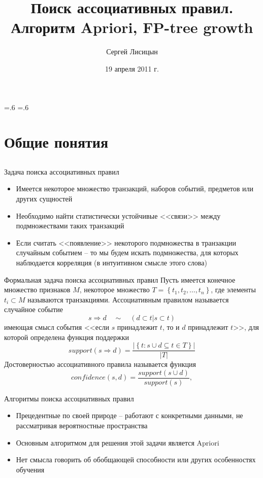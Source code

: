 \documentclass[compress,red]{beamer}
\title[Машинное обучение]{Поиск ассоциативных правил. Алгоритм Apriori, FP-tree growth}
\author{Сергей Лисицын}
\institute{}
\date{19 апреля 2011 г.}
\begin{document}
\section{}
\abovedisplayskip=.6\abovedisplayskip
\belowdisplayskip=.6\belowdisplayskip

\begin{frame}

\titlepage
\end{frame}
\section{Общие понятия}
\subsection{}

\begin{frame}{Задача поиска ассоциативных правил}
\begin{itemize}
	\item Имеется некоторое множество транзакций, наборов событий, предметов или других сущностей
	\item Необходимо найти статистически устойчивые <<связи>> между подмножествами таких транзакций
	\item Если считать <<появление>> некоторого подмножества в транзакции случайным событием -- то мы будем искать подмножества, для которых наблюдается корреляция (в интуитивном смысле этого слова)
\end{itemize}
\end{frame}

\begin{frame}{Формальная задача поиска ассоциативных правил}
Пусть имеется конечное множество признаков $M$, некоторое множество 
$T = \left\{ t_1, t_2, \dots , t_n \right\}$, где элементы $t_i \subset M$ называются транзакциями. 
Ассоциативным правилом называется случайное событие
$$
s \Rightarrow d \quad\sim\quad (d\subset t\vert s \subset t)
$$
имеющая смысл события <<если $s$ принадлежит $t$, то и $d$ принадлежит $t$>>,
для которой определена функция поддержки
$$
support (s\Rightarrow d) = \frac{|\left\{ t: s\cup d \subseteq t \in T\right\}|}{|T|}
$$
Достоверностью ассоциативного правила называется функция
$$
confidence (s,d) = \frac{support(s\cup d)}{support(s)},
$$

\end{frame}

\begin{frame}{Алгоритмы поиска ассоциативных правил}
\begin{itemize}
	\item Прецедентные по своей природе -- работают с конкретными данными, не рассматривая вероятностные пространства
	\item Основным алгоритмом для решения этой задачи является Apriori
	\item Нет смысла говорить об обобщающей способности или других особенностях обучения
\end{itemize}
\end{frame}
\end{document}
